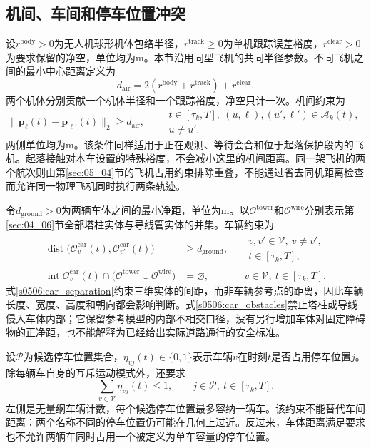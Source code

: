 \subsection{机间、车间和停车位置冲突}

设$r^{\mathrm{body}}>0$为无人机球形机体包络半径，$r^{\mathrm{track}}\ge0$为单机跟踪误差裕度，$r^{\mathrm{clear}}>0$为要求保留的净空，单位均为$\mathrm m$。本节沿用同型飞机的共同半径参数。不同飞机之间的最小中心距离定义为
\begin{equation}
 d_{\mathrm{air}}=2(r^{\mathrm{body}}+r^{\mathrm{track}})
                  +r^{\mathrm{clear}}.
 \label{s0506:air_separation_parameter}
\end{equation}
两个机体分别贡献一个机体半径和一个跟踪裕度，净空只计一次。机间约束为
\begin{equation}
 \|\mathbf p_\ell(t)-\mathbf p_{\ell'}(t)\|_2
 \ge d_{\mathrm{air}},
 \qquad
 \substack{t\in[\tau_k,T],\ (u,\ell),(u',\ell')\in\mathcal A_k(t),\\u\ne u'.}
 \label{s0506:air_separation}
\end{equation}
两侧单位均为$\mathrm m$。该条件同样适用于正在观测、等待会合和位于起落保护段内的飞机。起落接触对本车设置的特殊裕度，不会减小这里的机间距离。同一架飞机的两个航次则由第\ref{sec:05_04}节的飞机占用约束排除重叠，不能通过省去同机距离检查而允许同一物理飞机同时执行两条轨迹。

令$d_{\mathrm{ground}}>0$为两辆车体之间的最小净距，单位为$\mathrm m$。以$\mathcal O^{\mathrm{tower}}$和$\mathcal O^{\mathrm{wire}}$分别表示第\ref{sec:04_06}节全部塔柱实体与导线管实体的并集。车辆约束为
\begin{align}
 \operatorname{dist}\bigl(\mathcal O_v^{\mathrm{car}}(t),
                  \mathcal O_{v'}^{\mathrm{car}}(t)\bigr)
 &\ge d_{\mathrm{ground}},
 &&\substack{v,v'\in\mathcal V,\ v\ne v',\\t\in[\tau_k,T],}
 \label{s0506:car_separation}\\
 \operatorname{int}\mathcal O_v^{\mathrm{car}}(t)
 \cap\bigl(\mathcal O^{\mathrm{tower}}\cup
                \mathcal O^{\mathrm{wire}}\bigr)
 &=\varnothing,
 &&v\in\mathcal V,\ t\in[\tau_k,T].
 \label{s0506:car_obstacles}
\end{align}
式\eqref{s0506:car_separation}约束三维实体的间距，而非车辆参考点的距离，因此车辆长度、宽度、高度和朝向都会影响判断。式\eqref{s0506:car_obstacles}禁止塔柱或导线侵入车体内部；它保留参考模型的内部不相交口径，没有另行增加车体对固定障碍物的正净距，也不能解释为已经给出实际道路通行的安全标准。

设$\mathcal P$为候选停车位置集合，$\eta_{vj}(t)\in\{0,1\}$表示车辆$v$在时刻$t$是否占用停车位置$j$。除每辆车自身的互斥运动模式外，还要求
\begin{equation}
 \sum_{v\in\mathcal V}\eta_{vj}(t)\le1,
 \qquad j\in\mathcal P,\ t\in[\tau_k,T].
 \label{s0506:parking_capacity}
\end{equation}
左侧是无量纲车辆计数，每个候选停车位置最多容纳一辆车。该约束不能替代车间距离：两个名称不同的停车位置仍可能在几何上过近。反过来，车体距离满足要求也不允许两辆车同时占用一个被定义为单车容量的停车位置。

